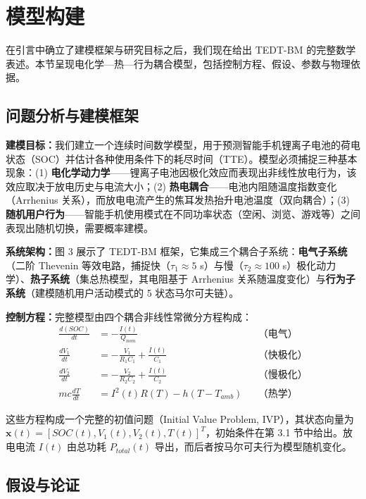 \documentclass[11pt,a4paper]{ctexart}
\begin{document}
\section{模型构建}

在引言中确立了建模框架与研究目标之后，我们现在给出 TEDT-BM 的完整数学表述。本节呈现电化学—热—行为耦合模型，包括控制方程、假设、参数与物理依据。

\subsection{问题分析与建模框架}

\textbf{建模目标：}我们建立一个连续时间数学模型，用于预测智能手机锂离子电池的荷电状态（SOC）并估计各种使用条件下的耗尽时间（TTE）。模型必须捕捉三种基本现象：(1) \textbf{电化学动力学}——锂离子电池因极化效应而表现出非线性放电行为，该效应取决于放电历史与电流大小；(2) \textbf{热电耦合}——电池内阻随温度指数变化（Arrhenius 关系），而放电电流产生的焦耳发热抬升电池温度（双向耦合）；(3) \textbf{随机用户行为}——智能手机使用模式在不同功率状态（空闲、浏览、游戏等）之间表现出随机切换，需要概率建模。

\textbf{系统架构：}图 3 展示了 TEDT-BM 框架，它集成三个耦合子系统：\textbf{电气子系统}（二阶 Thevenin 等效电路，捕捉快（$\tau_1 \approx 5$ s）与慢（$\tau_2 \approx 100$ s）极化动力学）、\textbf{热子系统}（集总热模型，其电阻基于 Arrhenius 关系随温度变化）与\textbf{行为子系统}（建模随机用户活动模式的 5 状态马尔可夫链）。

\textbf{控制方程：}完整模型由四个耦合非线性常微分方程构成：
\begin{equation*}
\begin{aligned}
\frac{d(SOC)}{dt} &= -\frac{I(t)}{Q_{nom}} &&\text{（电气）}\\[4pt]
\frac{dV_1}{dt} &= -\frac{V_1}{R_1C_1} + \frac{I(t)}{C_1} &&\text{（快极化）}\\[4pt]
\frac{dV_2}{dt} &= -\frac{V_2}{R_2C_2} + \frac{I(t)}{C_2} &&\text{（慢极化）}\\[4pt]
mc\frac{dT}{dt} &= I^2(t)R(T) - h\left(T - T_{amb}\right) &&\text{（热学）}
\end{aligned}
\end{equation*}

这些方程构成一个完整的初值问题（Initial Value Problem, IVP），其状态向量为 $\mathbf{x}(t) = [SOC(t), V_1(t), V_2(t), T(t)]^{T}$，初始条件在第 3.1 节中给出。放电电流 $I(t)$ 由总功耗 $P_{total}(t)$ 导出，而后者按马尔可夫行为模型随机变化。

\subsection{假设与论证}
\end{document}
